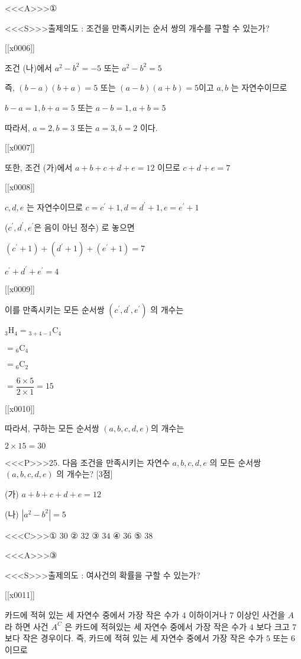 \documentclass{oblivoir}
\begin{document}
<<<A>>>①

<<<S>>>출제의도 : 조건을 만족시키는 순서 쌍의 개수를 구할 수 있는가?

[[x0006]]

조건 (나)에서
$a^{2}-b^{2}=-5$ 또는 $a^{2}-b^{2}=5$

즉, $(b-a)(b+a)=5$ 또는 $(a-b)(a+b)=5$이고 $a, b$ 는 자연수이므로

$b-a=1, b+a=5$ 또는 $a-b=1, a+b=5$

따라서, $a=2, b=3$ 또는 $a=3, b=2$ 이다.

[[x0007]]

또한, 조건 (가)에서 $a+b+c+d+e=12$ 이므로 $c+d+e=7$

[[x0008]]

$c, d, e$ 는 자연수이므로
$c=c^{\prime}+1, d=d^{\prime}+1, e=e^{\prime}+1$

($c^{\prime}, d^{\prime}, e^{\prime}$은 음이 아닌 정수) 로 놓으면

$\left(c^{\prime}+1\right)+\left(d^{\prime}+1\right)+\left(e^{\prime}+1\right)=7$

$c^{\prime}+d^{\prime}+e^{\prime}=4$

[[x0009]]

이를 만족시키는 모든 순서쌍 $\left(c^{\prime}, d^{\prime}, e^{\prime}\right)$
의 개수는

${ }_{3} \mathrm{H}_{4}={ }_{3+4-1} \mathrm{C}_{4}$

$={ }_{6} \mathrm{C}_{4}$

$={ }_{6} \mathrm{C}_{2}$

$=\dfrac{6 \times 5}{2 \times 1}=15$

[[x0010]]

따라서, 구하는 모든 순서쌍 $(a, b, c, d, e)$의 개수는

$2 \times 15=30$



<<<P>>>25. 다음 조건을 만족시키는 자연수 $a, b, c, d, e$ 의 모든 순서쌍 $(a, b, c, d, e)$ 의 개수는? [3점]

(가) $a+b+c+d+e=12$

(나) $\left|a^{2}-b^{2}\right|=5$

<<<C>>>① $30$
② $32$
③ $34$
④ $36$
⑤ $38$

<<<A>>>③

<<<S>>>출제의도 : 여사건의 확률을 구할 수 있는가?

[[x0011]]

카드에 적혀 있는 세 자연수 중에서 가장 작은 수가 $4$ 이하이거나 $7$ 이상인 사건을 $A$ 라 하면 사건 $A^{C}$ 은 카드에 적혀있는 세 자연수 중에서 가장 작은 수가 $4$ 보다 크고 $7$ 보다 작은 경우이다. 즉, 카드에 적혀 있는 세 자연수 중에서 가장 작은 수가 $5$ 또는 $6$ 이므로
\end{document}
